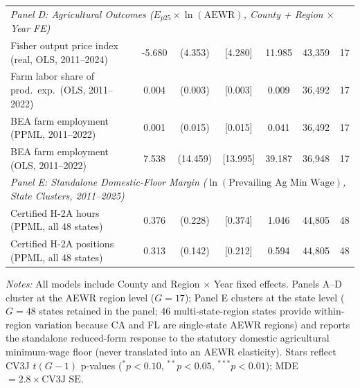 \begin{table}[!htbp]
\begin{tabular}{lcccccc}
\midrule
\multicolumn{7}{l}{\textit{Panel D: Agricultural Outcomes ($E_{p25} \times \ln(\text{AEWR})$, County + Region $\times$ Year FE)}} \\
Fisher output price index (real, OLS, 2011--2024) & -5.680 & (4.353) & [4.280] & 11.985 & 43,359 & 17 \\
Farm labor share of prod.\ exp.\ (OLS, 2011--2022) & 0.004 & (0.003) & [0.003] & 0.009 & 36,492 & 17 \\
BEA farm employment (PPML, 2011--2022) & 0.001 & (0.015) & [0.015] & 0.041 & 36,492 & 17 \\
BEA farm employment (OLS, 2011--2022) & 7.538 & (14.459) & [13.995] & 39.187 & 36,948 & 17 \\
\midrule
\multicolumn{7}{l}{\textit{Panel E: Standalone Domestic-Floor Margin ($\ln(\text{Prevailing Ag Min Wage})$, State Clusters, 2011--2025)}} \\
Certified H-2A hours (PPML, all 48 states) & 0.376 & (0.228) & [0.374] & 1.046 & 44,805 & 48 \\
Certified H-2A positions (PPML, all 48 states) & 0.313 & (0.142) & [0.212] & 0.594 & 44,805 & 48 \\
\bottomrule
\end{tabular}
\begin{minipage}{0.96\linewidth}
\vspace{0.4em}\footnotesize
\textit{Notes:} All models include County and Region $\times$ Year fixed effects. Panels A--D cluster at the AEWR region level ($G=17$); Panel E clusters at the state level ($G=48$ states retained in the panel; 46 multi-state-region states provide within-region variation because CA and FL are single-state AEWR regions) and reports the standalone reduced-form response to the statutory domestic agricultural minimum-wage floor (never translated into an AEWR elasticity). Stars reflect CV3J $t(G-1)$ p-values ($^{*}p<0.10$, $^{**}p<0.05$, $^{***}p<0.01$); MDE $= 2.8 \times \text{CV3J SE}$.
\end{minipage}
\end{table}

